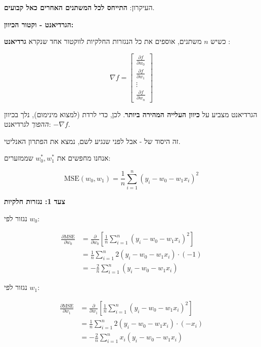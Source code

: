העיקרון: \textbf{התייחס לכל המשתנים האחרים כאל קבועים}.

\textbf{הגרדיאנט - וקטור הכיוון:}

כשיש $n$ משתנים, אוספים את כל הנגזרות החלקיות לווקטור אחד שנקרא \textbf{גרדיאנט} :

\begin{equation}
\nabla f = \begin{bmatrix} \frac{\partial f}{\partial w_0} \\ \frac{\partial f}{\partial w_1} \\ \vdots \\ \frac{\partial f}{\partial w_n} \end{bmatrix}
\end{equation}

הגרדיאנט מצביע על \textbf{כיוון העלייה המהירה ביותר}. לכן, כדי לרדת (למצוא מינימום), נלך בכיוון \textit{ההפוך} לגרדיאנט: $-\nabla f$.

זה היסוד של  - אבל לפני שנגיע לשם, נמצא את הפתרון האנליטי.


אנחנו מחפשים את $w_0^*, w_1^*$ שממזערים:

\begin{equation}
\text{MSE}(w_0, w_1) = \frac{1}{n} \sum_{i=1}^{n} (y_i - w_0 - w_1 x_i)^2
\end{equation}

\textbf{צעד \num{1}: נגזרות חלקיות}

נגזור לפי $w_0$:

\begin{align}
\frac{\partial \text{MSE}}{\partial w_0} &= \frac{\partial}{\partial w_0} \left[ \frac{1}{n} \sum_{i=1}^{n} (y_i - w_0 - w_1 x_i)^2 \right] \nonumber \\
&= \frac{1}{n} \sum_{i=1}^{n} 2(y_i - w_0 - w_1 x_i) \cdot (-1) \nonumber \\
&= -\frac{2}{n} \sum_{i=1}^{n} (y_i - w_0 - w_1 x_i)
\end{align}

נגזור לפי $w_1$:

\begin{align}
\frac{\partial \text{MSE}}{\partial w_1} &= \frac{\partial}{\partial w_1} \left[ \frac{1}{n} \sum_{i=1}^{n} (y_i - w_0 - w_1 x_i)^2 \right] \nonumber \\
&= \frac{1}{n} \sum_{i=1}^{n} 2(y_i - w_0 - w_1 x_i) \cdot (-x_i) \nonumber \\
&= -\frac{2}{n} \sum_{i=1}^{n} x_i(y_i - w_0 - w_1 x_i)
\end{align}

